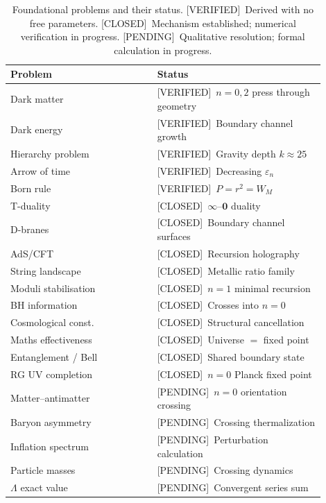 \documentclass[prd,twocolumn,preprintnumbers,amsmath,amssymb]{revtex4-2}
\newcommand{\verified}{\textcolor{green!60!black}{[VERIFIED]}}
\newcommand{\closed}{\textcolor{green!60!black}{[CLOSED]}}
\newcommand{\pending}{\textcolor{red!70!black}{[PENDING]}}
\newcommand{\acc}{\mathbf{\infty}}
\newcommand{\inv}{\mathbf{0}}
\begin{document}
\begin{table}[h]
\caption{Foundational problems and their status.
\verified\ Derived with no free parameters.
\closed\ Mechanism established; numerical verification in progress.
\pending\ Qualitative resolution; formal calculation in progress.}
\label{tab:problems}
\begin{ruledtabular}
\begin{tabular}{p{0.42\linewidth}p{0.48\linewidth}}
Problem & Status \\
\hline
Dark matter & \verified\ $n{=}0,2$ press through geometry \\
Dark energy & \verified\ Boundary channel growth \\
Hierarchy problem & \verified\ Gravity depth $k\approx 25$ \\
Arrow of time & \verified\ Decreasing $\varepsilon_n$ \\
Born rule & \verified\ $P = r^2 = W_M$ \\
T-duality & \closed\ $\acc$--$\inv$ duality \\
D-branes & \closed\ Boundary channel surfaces \\
AdS/CFT & \closed\ Recursion holography \\
String landscape & \closed\ Metallic ratio family \\
Moduli stabilisation & \closed\ $n{=}1$ minimal recursion \\
BH information & \closed\ Crosses into $n{=}0$ \\
Cosmological const. & \closed\ Structural cancellation \\
Maths effectiveness & \closed\ Universe $=$ fixed point \\
Entanglement / Bell & \closed\ Shared boundary state \\
RG UV completion & \closed\ $n{=}0$ Planck fixed point \\
Matter--antimatter & \pending\ $n{=}0$ orientation crossing \\
Baryon asymmetry & \pending\ Crossing thermalization \\
Inflation spectrum & \pending\ Perturbation calculation \\
Particle masses & \pending\ Crossing dynamics \\
$\Lambda$ exact value & \pending\ Convergent series sum \\
\end{tabular}
\end{ruledtabular}
\end{table}
\end{document}
